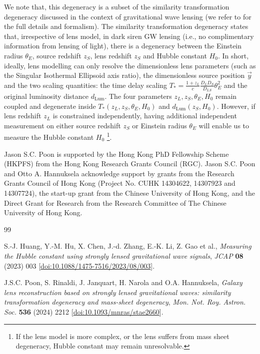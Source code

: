 \documentclass[a4paper,11pt]{article}
\begin{document}
We note that, this degeneracy is a subset of the similarity transformation degeneracy discussed in the context of gravitational wave lensing (we refer to \cite{poon2024galaxylensreconstructionbased} for the full details and formalism).
The similarity transformation degeneracy states that, irrespective of lens model, in dark siren GW lensing (i.e., no complimentary information from lensing of light), there is a degeneracy between the Einstein radius $\theta_E$, source redshift $z_S$, lens redshift $z_S$ and Hubble constant $H_0$. 
In short, ideally, lens modelling can only resolve the dimensionless lens parameters (such as the Singular Isothermal Ellipsoid axis ratio), the dimensionless source position $\vec{y}$ and the two scaling quantities: the time delay scaling $T_*=\frac{1+z_L}{c}\frac{D_L D_S}{D_{LS}}\theta_E^2$ and the original luminosity distance $d_\text{Lum}$. 
The four parameters $z_L, z_S, \theta_E, H_0$ remain coupled and degenerate inside $T_*(z_L, z_S, \theta_E, H_0)$ and $d_\text{Lum}(z_S, H_0)$.
However, if lens redshift $z_L$ is constrained independently, having additional independent measurement on either source redshift $z_S$ or Einstein radius $\theta_E$ will enable us to measure the Hubble constant $H_0$ \footnote{If the lens model is more complex, or the lens suffers from mass sheet degeneracy, Hubble constant may remain unresolvable.}.






\acknowledgments
Jason S.C. Poon is supported by the Hong Kong PhD Fellowship Scheme (HKPFS) from the Hong Kong Research Grants Council (RGC). 
Jason S.C. Poon and Otto A. Hannuksela acknowledge support by grants from the Research Grants Council of Hong Kong (Project No. CUHK 14304622, 14307923 and  14307724), the start-up grant from the Chinese University of Hong Kong, and the Direct Grant for Research from the Research Committee of The Chinese University of Hong Kong. 


\begin{thebibliography}{99}

S.-J. Huang, Y.-M. Hu, X. Chen, J.-d. Zhang, E.-K. Li, Z. Gao et al., 
\emph{Measuring the Hubble constant using strongly lensed gravitational wave signals}, 
\emph{JCAP} {\bf 08} (2023) 003 [\href{https://doi.org/10.1088/1475-7516/2023/08/003}{doi:10.1088/1475-7516/2023/08/003}].

J.S.C. Poon, S. Rinaldi, J. Janquart, H. Narola and O.A. Hannuksela, 
\emph{Galaxy lens reconstruction based on strongly lensed gravitational waves: similarity transformation degeneracy and mass-sheet degeneracy}, 
\emph{Mon. Not. Roy. Astron. Soc.} {\bf 536} (2024) 2212 [\href{https://doi.org}{doi:10.1093/mnras/stae2660}].

\end{thebibliography}
\end{document}
